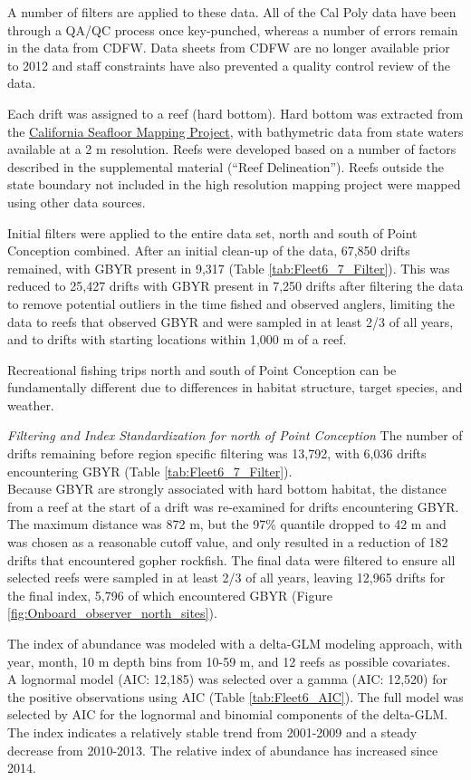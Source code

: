 \documentclass[12pt,]{article}
\begin{document}
A number of filters are applied to these data. All of the Cal Poly data
have been through a QA/QC process once key-punched, whereas a number of
errors remain in the data from CDFW. Data sheets from CDFW are no longer
available prior to 2012 and staff constraints have also prevented a
quality control review of the data.

Each drift was assigned to a reef (hard bottom). Hard bottom was
extracted from the
\href{http://seafloor.otterlabs.org/index.html}{California Seafloor
Mapping Project}, with bathymetric data from state waters available at a
2 m resolution. Reefs were developed based on a number of factors
described in the supplemental material (``Reef Delineation''). Reefs
outside the state boundary not included in the high resolution mapping
project were mapped using other data sources.

Initial filters were applied to the entire data set, north and south of
Point Conception combined. After an initial clean-up of the data, 67,850
drifts remained, with GBYR present in 9,317 (Table
\ref{tab:Fleet6_7_Filter}). This was reduced to 25,427 drifts with GBYR
present in 7,250 drifts after filtering the data to remove potential
outliers in the time fished and observed anglers, limiting the data to
reefs that observed GBYR and were sampled in at least 2/3 of all years,
and to drifts with starting locations within 1,000 m of a reef.

Recreational fishing trips north and south of Point Conception can be
fundamentally different due to differences in habitat structure, target
species, and weather.

\emph{Filtering and Index Standardization for north of Point Conception}
The number of drifts remaining before region specific filtering was
13,792, with 6,036 drifts encountering GBYR (Table
\ref{tab:Fleet6_7_Filter}).\\
Because GBYR are strongly associated with hard bottom habitat, the
distance from a reef at the start of a drift was re-examined for drifts
encountering GBYR. The maximum distance was 872 m, but the 97\% quantile
dropped to 42 m and was chosen as a reasonable cutoff value, and only
resulted in a reduction of 182 drifts that encountered gopher rockfish.
The final data were filtered to ensure all selected reefs were sampled
in at least 2/3 of all years, leaving 12,965 drifts for the final index,
5,796 of which encountered GBYR (Figure
\ref{fig:Onboard_observer_north_sites}).

The index of abundance was modeled with a delta-GLM modeling approach,
with year, month, 10 m depth bins from 10-59 m, and 12 reefs as possible
covariates. A lognormal model (AIC: 12,185) was selected over a gamma
(AIC: 12,520) for the positive observations using AIC (Table
\ref{tab:Fleet6_AIC}). The full model was selected by AIC for the
lognormal and binomial components of the delta-GLM. The index indicates
a relatively stable trend from 2001-2009 and a steady decrease from
2010-2013. The relative index of abundance has increased since 2014.
\end{document}
